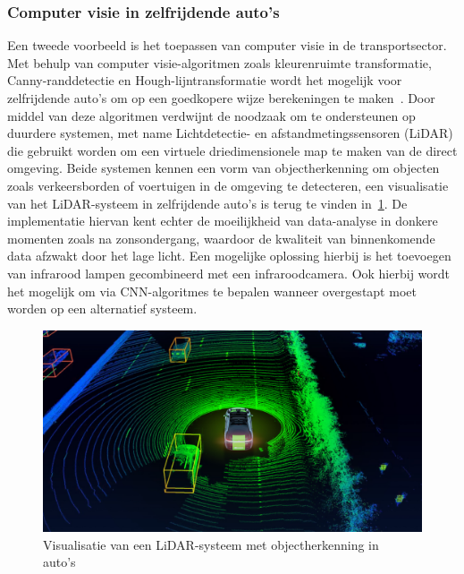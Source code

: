 \subsubsection{Computer visie in zelfrijdende auto's}
Een tweede voorbeeld is het toepassen van computer visie in de transportsector.
Met behulp van computer visie-algoritmen zoals kleurenruimte transformatie, Canny-randdetectie en Hough-lijntransformatie wordt het mogelijk voor zelfrijdende auto's om op een goedkopere wijze berekeningen te maken~\autocite{Gajjar2023}.
Door middel van deze algoritmen verdwijnt de noodzaak om te ondersteunen op duurdere systemen, met name Lichtdetectie- en afstandmetingssensoren (LiDAR) die gebruikt worden om een virtuele driedimensionele map te maken van de direct omgeving.
Beide systemen kennen een vorm van objectherkenning om objecten zoals verkeersborden of voertuigen in de omgeving te detecteren, een visualisatie van het LiDAR-systeem in zelfrijdende auto's is terug te vinden in~\ref{fig:visualisatie-lidar}.
De implementatie hiervan kent echter de moeilijkheid van data-analyse in donkere momenten zoals na zonsondergang, waardoor de kwaliteit van binnenkomende data afzwakt door het lage licht.
Een mogelijke oplossing hierbij is het toevoegen van infrarood lampen gecombineerd met een infraroodcamera.
Ook hierbij wordt het mogelijk om via CNN-algoritmes te bepalen wanneer overgestapt moet worden op een alternatief systeem.
\begin{figure}
    \includegraphics[width=1\linewidth]{images/visualisatie-lidar}
    \caption{Visualisatie van een LiDAR-systeem met objectherkenning in auto's~\autocite{Badoni2021}}
    \label{fig:visualisatie-lidar}
\end{figure}

